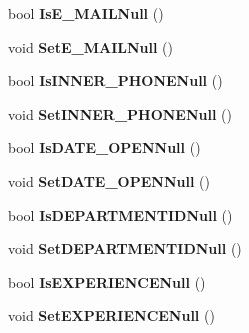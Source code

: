 \begin{CompactItemize}
\item 
bool \textbf{IsE\_\-MAILNull} ()\label{class_automatic_medical_system_1_1_data_set1_1_1_v_s_p_e_c_i_a_l_d_o_c_t_o_r_row_1d814ffb795df2e4281d2be47ff9cfb4}

\item 
void \textbf{SetE\_\-MAILNull} ()\label{class_automatic_medical_system_1_1_data_set1_1_1_v_s_p_e_c_i_a_l_d_o_c_t_o_r_row_ea4871272709225d27ae5fd15e0f7387}

\item 
bool \textbf{IsINNER\_\-PHONENull} ()\label{class_automatic_medical_system_1_1_data_set1_1_1_v_s_p_e_c_i_a_l_d_o_c_t_o_r_row_e3e179c8b92d74f5f362df4a987dab6f}

\item 
void \textbf{SetINNER\_\-PHONENull} ()\label{class_automatic_medical_system_1_1_data_set1_1_1_v_s_p_e_c_i_a_l_d_o_c_t_o_r_row_e7c2efd5ee5635f7f1de28b36f2030ee}

\item 
bool \textbf{IsDATE\_\-OPENNull} ()\label{class_automatic_medical_system_1_1_data_set1_1_1_v_s_p_e_c_i_a_l_d_o_c_t_o_r_row_2ac969ea833000bfb21ebd7d01137a7b}

\item 
void \textbf{SetDATE\_\-OPENNull} ()\label{class_automatic_medical_system_1_1_data_set1_1_1_v_s_p_e_c_i_a_l_d_o_c_t_o_r_row_256a87b0bebfba5278079629cd29e1f4}

\item 
bool \textbf{IsDEPARTMENTIDNull} ()\label{class_automatic_medical_system_1_1_data_set1_1_1_v_s_p_e_c_i_a_l_d_o_c_t_o_r_row_13b22b8e657e7ab41d71637858122de2}

\item 
void \textbf{SetDEPARTMENTIDNull} ()\label{class_automatic_medical_system_1_1_data_set1_1_1_v_s_p_e_c_i_a_l_d_o_c_t_o_r_row_56504af413e08681f5f0562fdf7d7350}

\item 
bool \textbf{IsEXPERIENCENull} ()\label{class_automatic_medical_system_1_1_data_set1_1_1_v_s_p_e_c_i_a_l_d_o_c_t_o_r_row_63b346dfeee084416f2f4b1ad6696b4c}

\item 
void \textbf{SetEXPERIENCENull} ()\label{class_automatic_medical_system_1_1_data_set1_1_1_v_s_p_e_c_i_a_l_d_o_c_t_o_r_row_45768d2f57e951b98712dd0216cc0043}

\end{CompactItemize}
